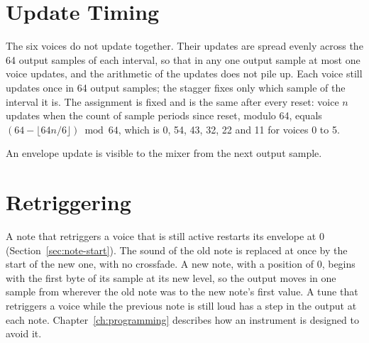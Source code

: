 \section{Update Timing}
\label{sec:envelope-timing}

The six voices do not update together. Their updates are spread evenly across the 64 output samples of each interval,
so that in any one output sample at most one voice updates, and the arithmetic of the updates does not pile up. Each
voice still updates once in 64 output samples; the stagger fixes only which sample of the interval it is. The
assignment is fixed and is the same after every reset: voice $n$ updates when the count of sample periods since reset,
modulo 64, equals $(64 - \lfloor 64n/6 \rfloor) \bmod 64$, which is 0, 54, 43, 32, 22 and 11 for voices 0 to 5.

An envelope update is visible to the mixer from the next output sample.

\section{Retriggering}

A note that retriggers a voice that is still active restarts its envelope at 0 (Section~\ref{sec:note-start}). The
sound of the old note is replaced at once by the start of the new one, with no crossfade. A new note, with a position
of 0, begins with the first byte of its sample at its new level, so the output moves in one sample from wherever the
old note was to the new note's first value. A tune that retriggers a voice while the previous note is still loud has a
step in the output at each note. Chapter~\ref{ch:programming} describes how an instrument is designed to avoid it.
